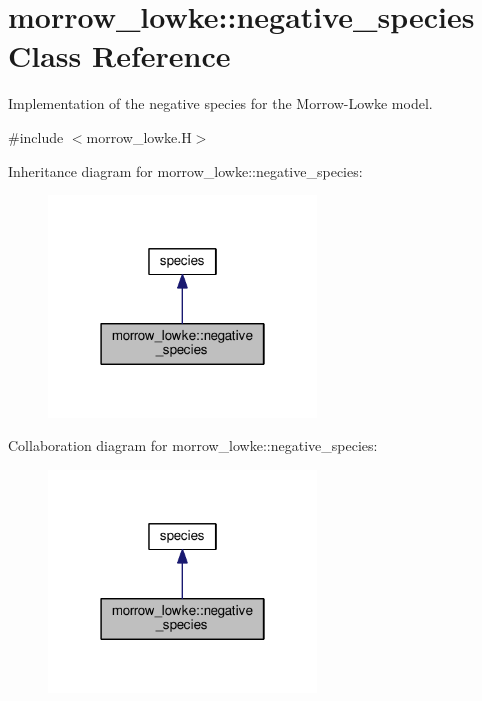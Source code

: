 \hypertarget{classmorrow__lowke_1_1negative__species}{}\section{morrow\+\_\+lowke\+:\+:negative\+\_\+species Class Reference}
\label{classmorrow__lowke_1_1negative__species}


Implementation of the negative species for the Morrow-\/\+Lowke model.  




{\ttfamily \#include $<$morrow\+\_\+lowke.\+H$>$}



Inheritance diagram for morrow\+\_\+lowke\+:\+:negative\+\_\+species\+:\nopagebreak
\begin{figure}[H]
\begin{center}
\leavevmode
\includegraphics[width=202pt]{classmorrow__lowke_1_1negative__species__inherit__graph}
\end{center}
\end{figure}


Collaboration diagram for morrow\+\_\+lowke\+:\+:negative\+\_\+species\+:\nopagebreak
\begin{figure}[H]
\begin{center}
\leavevmode
\includegraphics[width=202pt]{classmorrow__lowke_1_1negative__species__coll__graph}
\end{center}
\end{figure}
